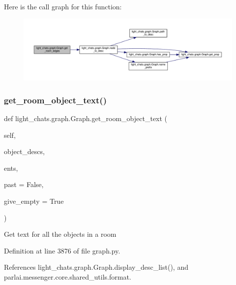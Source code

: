 Here is the call graph for this function\+:
\nopagebreak
\begin{figure}[H]
\begin{center}
\leavevmode
\includegraphics[width=350pt]{classlight__chats_1_1graph_1_1Graph_a1d2efb53425d6f495516d656124413c0_cgraph}
\end{center}
\end{figure}
\mbox{\label{classlight__chats_1_1graph_1_1Graph_a4d24052d36cff3896424e2e3bce2d554}} 
\subsubsection{\texorpdfstring{get\+\_\+room\+\_\+object\+\_\+text()}{get\_room\_object\_text()}}
{\footnotesize\ttfamily def light\+\_\+chats.\+graph.\+Graph.\+get\+\_\+room\+\_\+object\+\_\+text (\begin{DoxyParamCaption}\item[{}]{self,  }\item[{}]{object\+\_\+descs,  }\item[{}]{ents,  }\item[{}]{past = {\ttfamily False},  }\item[{}]{give\+\_\+empty = {\ttfamily True} }\end{DoxyParamCaption})}

\begin{DoxyVerb}Get text for all the objects in a room\end{DoxyVerb}
 

Definition at line 3876 of file graph.\+py.



References light\+\_\+chats.\+graph.\+Graph.\+display\+\_\+desc\+\_\+list(), and parlai.\+messenger.\+core.\+shared\+\_\+utils.\+format.

